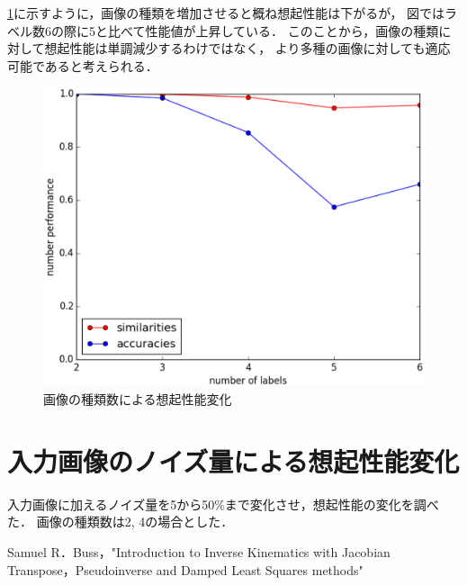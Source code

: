 \documentclass[10pt,twocolumn]{jarticle}
\newcommand{\figref}[1]{\figurename\ref{fig:#1}}
\begin{document}
\figref{labels-performance}に示すように，画像の種類を増加させると概ね想起性能は下がるが，
図ではラベル数6の際に5と比べて性能値が上昇している．
このことから，画像の種類に対して想起性能は単調減少するわけではなく，
より多種の画像に対しても適応可能であると考えられる．
\begin{figure}[hbtp]
  \centering
    \includegraphics[width=\columnwidth]{figs/labels_performance}
    \caption{画像の種類数による想起性能変化}
    \label{fig:labels-performance}
\end{figure}


\section{入力画像のノイズ量による想起性能変化}
入力画像に加えるノイズ量を5から50\%まで変化させ，想起性能の変化を調べた．
画像の種類数は2, 4の場合とした．




\begin{thebibliography}{9}
   Samuel R．Buss，"Introduction to Inverse Kinematics with Jacobian Transpose，Pseudoinverse and Damped Least Squares methods"
\end{thebibliography}
\end{document}
